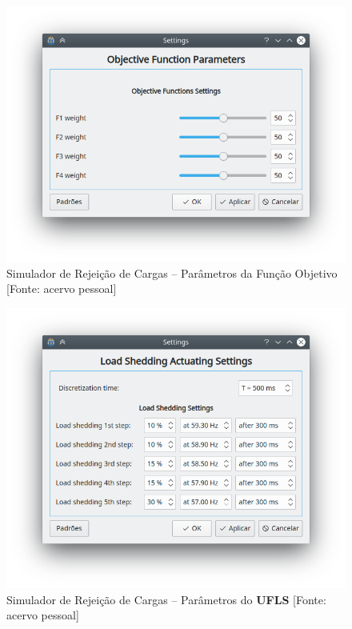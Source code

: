 \begin{figure}
	\centering
	\includegraphics[width=0.8\linewidth]{figuras/parameters}
	\caption[Simulador de Rejei{\c c}{\~a}o de Cargas \--- Par{\^a}metros da Fun{\c c}{\~a}o Objetivo]{Simulador de Rejei{\c c}{\~a}o de Cargas \--- Par{\^a}metros da Fun{\c c}{\~a}o Objetivo [Fonte: acervo pessoal]}
	\label{fig:sim_setpar}
\end{figure}

\begin{figure}
	\centering
	\includegraphics[width=0.8\linewidth]{figuras/settings}
	\caption[Simulador de Rejei{\c c}{\~a}o de Cargas \--- Par{\^a}metros ddo \textbf{UFLS}]{Simulador de Rejei{\c c}{\~a}o de Cargas \--- Par{\^a}metros do \textbf{UFLS} [Fonte: acervo pessoal]}
	\label{fig:sim_setls}
\end{figure}

